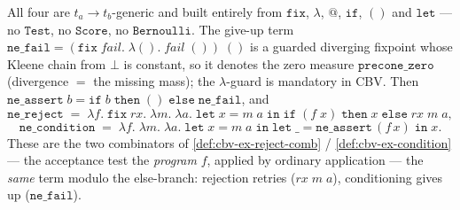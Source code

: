 \begin{definition}\label{def:cbv-hard-combinators}
\rocqok
{}\rocqok
{}\rocqok
{}\rocqok
{}
All four are $t_a \to t_b$-generic and built entirely from
$\mathtt{fix}$, $\lambda$, $@$, $\mathtt{if}$, $()$ and $\mathtt{let}$
--- no $\mathtt{Test}$, no $\mathtt{Score}$, no $\mathtt{Bernoulli}$. The
give-up term
$\mathtt{ne\_fail} = (\mathtt{fix}\;\textit{fail}.\;\lambda().\;
\textit{fail}\;())\;()$ is a guarded diverging fixpoint whose Kleene
chain from $\bot$ is constant, so it denotes the zero measure
$\mathtt{precone\_zero}$ (divergence $=$ the missing mass); the
$\lambda$-guard is mandatory in CBV. Then
$\mathtt{ne\_assert}\;b =
\mathtt{if}\;b\;\mathtt{then}\;()\;\mathtt{else}\;\mathtt{ne\_fail}$, and
\[
  \mathtt{ne\_reject}
  \;=\;
  \lambda f.\;\mathtt{fix}\;\textit{rx}.\;\lambda m.\;\lambda a.\;
    \mathtt{let}\;x = m\;a\;\mathtt{in}\;
    \mathtt{if}\;(f\;x)\;
    \mathtt{then}\;x\;
    \mathtt{else}\;\textit{rx}\;m\;a,
\]
\[
  \mathtt{ne\_condition}
  \;=\;
  \lambda f.\;\lambda m.\;\lambda a.\;
    \mathtt{let}\;x = m\;a\;\mathtt{in}\;
    \mathtt{let}\;\_ = \mathtt{ne\_assert}\,(f\,x)\;\mathtt{in}\;x.
\]
These are the two combinators of \autoref{def:cbv-ex-reject-comb} /
\autoref{def:cbv-ex-condition} --- the acceptance test the
\emph{program} $f$, applied by ordinary application --- the \emph{same}
term modulo the else-branch: rejection retries ($\textit{rx}\;m\;a$),
conditioning gives up ($\mathtt{ne\_fail}$).
\end{definition}

